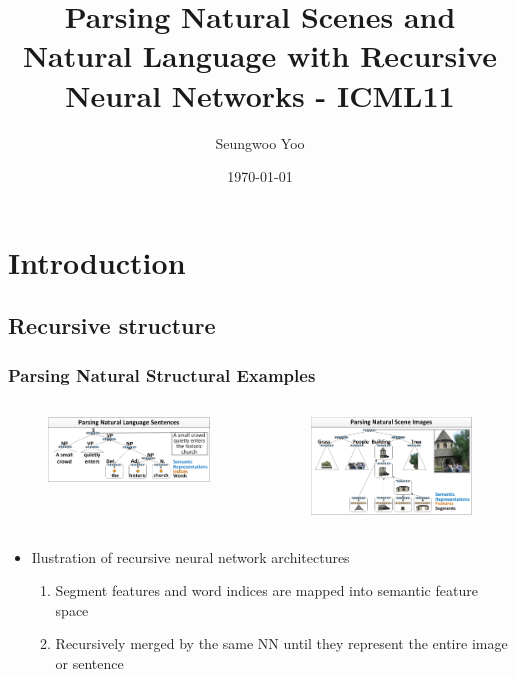 \documentclass{beamer}
\title{Parsing Natural Scenes and Natural Language with Recursive Neural Networks - ICML11}
\author{Seungwoo Yoo}
\date{\today}
\begin{document}
\frame{\titlepage}

\section[Outline]{}
\frame{\tableofcontents}

\section{Introduction}
\subsection{Recursive structure}
\frame
{
  \frametitle{Parsing Natural Structural Examples}
  \begin{columns}
  \begin{figure}[ht]  
	  \begin{center}
		  \includegraphics[width=2.1in]{images/fig1.png}   
	  \end{center}   
  \end{figure}
  \begin{figure}[ht]
	  \begin{center}
		  \includegraphics[width=2.1in]{images/fig2.png} 
	  \end{center}
  \end{figure}
  \end{columns}
  \begin{itemize}
  \item Ilustration of recursive neural network architectures
	\begin{enumerate}
	\item Segment features and word indices are mapped into semantic feature space
	\item Recursively merged by the same NN until they represent the entire image or sentence
	\end{enumerate}
  \end{itemize}
}
\end{document}
